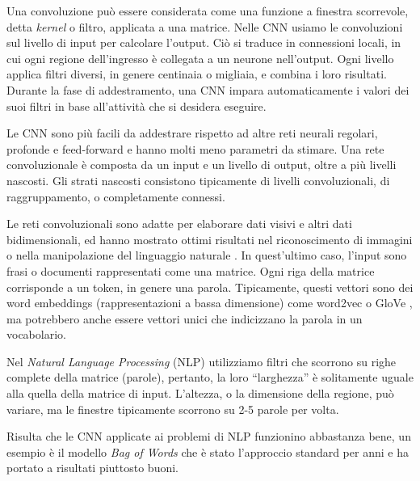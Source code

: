 Una convoluzione può essere considerata come una funzione a finestra scorrevole, detta \emph{kernel} o filtro, applicata a una matrice. 
Nelle CNN usiamo le convoluzioni sul livello di input per calcolare l'output. Ciò si traduce in connessioni locali, in cui ogni regione dell'ingresso è collegata a un neurone nell'output. Ogni livello applica filtri diversi, in genere centinaia o migliaia, e combina i loro risultati. 
Durante la fase di addestramento, una CNN impara automaticamente i valori dei suoi filtri in base all'attività che si desidera eseguire. 

Le CNN sono più facili da addestrare rispetto ad altre reti neurali regolari, profonde e feed-forward e hanno molti meno parametri da stimare. Una rete convoluzionale è composta da un input e un livello di output, oltre a più livelli nascosti. Gli strati nascosti consistono tipicamente di livelli convoluzionali, di raggruppamento, o completamente connessi.

Le reti convoluzionali sono adatte per elaborare dati visivi e altri dati bidimensionali, ed hanno mostrato ottimi risultati nel riconoscimento di immagini o nella manipolazione del linguaggio naturale \cite{manning1999foundations,FIXME}.
In quest'ultimo caso, l'input sono frasi o documenti rappresentati come una matrice. Ogni riga della matrice corrisponde a un token, in genere una parola. Tipicamente, questi vettori sono dei word embeddings (rappresentazioni a bassa dimensione) come word2vec \cite{mikolov2013distributed} o GloVe \cite{pennington2014glove}, ma potrebbero anche essere vettori unici che indicizzano la parola in un vocabolario. 

Nel \emph{Natural Language Processing} (NLP) utilizziamo filtri che scorrono su righe complete della matrice (parole), pertanto, la loro ``larghezza'' è solitamente uguale alla quella della matrice di input. L'altezza, o la dimensione della regione, può variare, ma le finestre tipicamente scorrono su 2-5 parole per volta. 

Risulta che le CNN applicate ai problemi di NLP funzionino abbastanza bene, un esempio è il modello \emph{Bag of Words} che è stato l'approccio standard per anni e ha portato a risultati piuttosto buoni.
